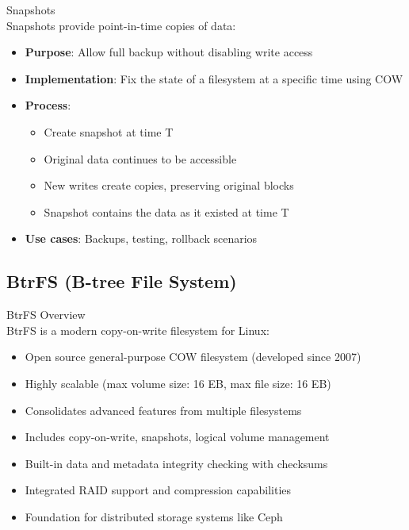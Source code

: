 \begin{definition}{Snapshots}\\
    Snapshots provide point-in-time copies of data:
    \begin{itemize}
        \item \textbf{Purpose}: Allow full backup without disabling write access
        \item \textbf{Implementation}: Fix the state of a filesystem at a specific time using COW
        \item \textbf{Process}:
            \begin{itemize}
                \item Create snapshot at time T
                \item Original data continues to be accessible
                \item New writes create copies, preserving original blocks
                \item Snapshot contains the data as it existed at time T
            \end{itemize}
        \item \textbf{Use cases}: Backups, testing, rollback scenarios
    \end{itemize}
\end{definition}

\subsection{BtrFS (B-tree File System)}

\begin{definition}{BtrFS Overview}\\
    BtrFS is a modern copy-on-write filesystem for Linux:
    \begin{itemize}
        \item Open source general-purpose COW filesystem (developed since 2007)
        \item Highly scalable (max volume size: 16 EB, max file size: 16 EB)
        \item Consolidates advanced features from multiple filesystems
        \item Includes copy-on-write, snapshots, logical volume management
        \item Built-in data and metadata integrity checking with checksums
        \item Integrated RAID support and compression capabilities
        \item Foundation for distributed storage systems like Ceph
    \end{itemize}
\end{definition}


